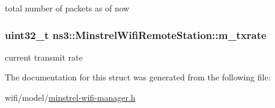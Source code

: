 total number of packets as of now 

\subsubsection[{\texorpdfstring{m\+\_\+txrate}{m_txrate}}]{\setlength{\rightskip}{0pt plus 5cm}uint32\+\_\+t ns3\+::\+Minstrel\+Wifi\+Remote\+Station\+::m\+\_\+txrate}\hypertarget{structns3_1_1MinstrelWifiRemoteStation_af6c3b623281d34e7f9b2a22270f4aab9}{}\label{structns3_1_1MinstrelWifiRemoteStation_af6c3b623281d34e7f9b2a22270f4aab9}


current transmit rate 



The documentation for this struct was generated from the following file\+:\begin{DoxyCompactItemize}
\item 
wifi/model/\hyperlink{minstrel-wifi-manager_8h}{minstrel-\/wifi-\/manager.\+h}\end{DoxyCompactItemize}

